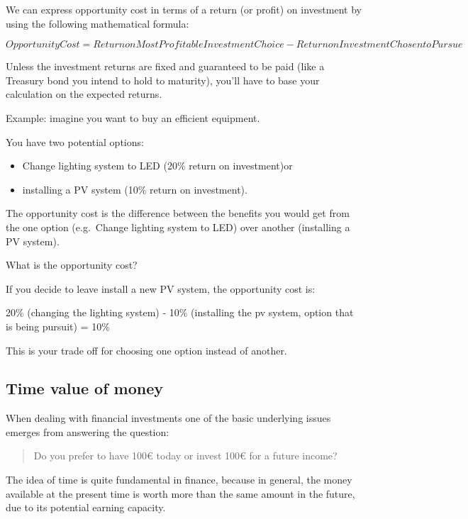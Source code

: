 \documentclass[]{book}
\newcommand{\euro}{€}
\providecommand{\tightlist}{%
  \setlength{\itemsep}{0pt}\setlength{\parskip}{0pt}}
\theoremstyle{definition}
\theoremstyle{definition}
\theoremstyle{definition}
\theoremstyle{remark}
\begin{document}
We can express opportunity cost in terms of a return (or profit) on
investment by using the following mathematical formula:

\[Opportunity Cost = Return on Most Profitable Investment Choice - Return on Investment Chosen to Pursue\]

Unless the investment returns are fixed and guaranteed to be paid (like
a Treasury bond you intend to hold to maturity), you'll have to base
your calculation on the expected returns.

Example: imagine you want to buy an efficient equipment.

You have two potential options:

\begin{itemize}
\tightlist
\item
  Change lighting system to LED (20\% return on investment)or
\item
  installing a PV system (10\% return on investment).
\end{itemize}

The opportunity cost is the difference between the benefits you would
get from the one option (e.g.~Change lighting system to LED) over
another (installing a PV system).

What is the opportunity cost?

If you decide to leave install a new PV system, the opportunity cost is:

20\% (changing the lighting system) - 10\% (installing the pv system,
option that is being pursuit) = 10\%

This is your trade off for choosing one option instead of another.

\subsection{Time value of money}\label{time-value-of-money}

When dealing with financial investments one of the basic underlying
issues emerges from answering the question:

\begin{quote}
Do you prefer to have 100\euro{} today or invest 100\euro{} for a future
income?
\end{quote}

The idea of time is quite fundamental in finance, because in general,
the money available at the present time is worth more than the same
amount in the future, due to its potential earning capacity.
\end{document}
